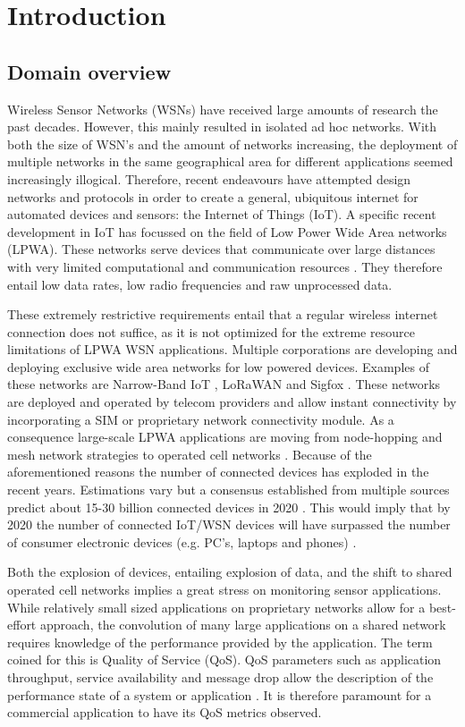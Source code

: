 \chapter{Introduction}
\section{Domain overview}
Wireless Sensor Networks (WSNs) have received large amounts of research the past decades. However, this mainly resulted in isolated ad hoc networks. With both the size of WSN's and the amount of networks increasing, the deployment of multiple networks in the same geographical area for different applications seemed increasingly illogical. Therefore, recent endeavours have attempted design networks and protocols in order to create a general, ubiquitous internet for automated devices and sensors: the Internet of Things (IoT). A specific recent development in IoT has focussed on the field of Low Power Wide Area networks (LPWA). These networks serve devices that communicate over large distances with very limited computational and communication resources \cite{value_of}. They therefore entail low data rates, low radio frequencies and raw unprocessed data.

These extremely restrictive requirements entail that a regular wireless internet connection does not suffice, as it is not optimized for the extreme resource limitations of LPWA WSN applications. Multiple corporations are developing and deploying exclusive wide area networks for low powered devices. Examples of these networks are Narrow-Band IoT \cite{nbiot}, LoRaWAN \cite{web:lora} and Sigfox \cite{web:sigfox}. These networks are deployed and operated by telecom providers and allow instant connectivity by incorporating a SIM or proprietary network connectivity module. As a consequence large-scale LPWA applications are moving from node-hopping and mesh network strategies to operated cell networks \cite{movement_to_cellular, movement_to_cellular_2}. Because of the aforementioned reasons the number of connected devices has exploded in the recent years. Estimations vary but a consensus established from multiple sources predict about 15-30 billion connected devices in 2020 \cite{nr_devices_gartner, nr_devices_forbes, security_risks_ocean_connect, nr_devices_ericsson}. This would imply that by 2020 the number of connected IoT/WSN devices will have surpassed the number of consumer electronic devices (e.g. PC's, laptops and phones) \cite{nr_devices_ericsson}.

Both the explosion of devices, entailing explosion of data, and the shift to shared operated cell networks implies a great stress on monitoring sensor applications. While relatively small sized applications on proprietary networks allow for a best-effort approach, the convolution of many large applications on a shared network requires knowledge of the performance provided by the application. The term coined for this is Quality of Service (QoS). QoS parameters such as application throughput, service availability and message drop allow the description of the performance state of a system or application \cite{qos_definition}. It is therefore paramount for a commercial application to have its QoS metrics observed.

